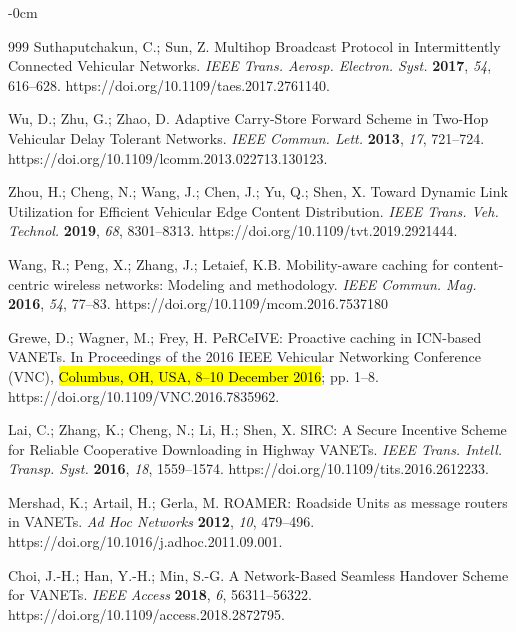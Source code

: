 \documentclass[electronics,aricle,accept,pdftex,moreauthors]{Definitions/mdpi}
\begin{document}
\begin{adjustwidth}{-\extralength}{0cm}
\begin{thebibliography}{999}
Suthaputchakun, C.; Sun, Z. Multihop Broadcast Protocol in Intermittently Connected Vehicular Networks. \emph{IEEE Trans. Aerosp. Electron. Syst.} \textbf{2017}, \emph{54}, 616–628. https://doi.org/10.1109/taes.2017.2761140.

Wu, D.; Zhu, G.; Zhao, D. Adaptive Carry-Store Forward Scheme in Two-Hop Vehicular Delay Tolerant Networks. \emph{IEEE Commun. Lett.} \textbf{2013}, \emph{17}, 721–724. https://doi.org/10.1109/lcomm.2013.022713.130123.

Zhou, H.; Cheng, N.; Wang, J.; Chen, J.; Yu, Q.; Shen, X. Toward Dynamic Link Utilization for Efficient Vehicular Edge Content Distribution. \emph{IEEE Trans. Veh. Technol.} \textbf{2019}, \emph{68}, 8301–8313. https://doi.org/10.1109/tvt.2019.2921444.

Wang, R.; Peng, X.; Zhang, J.; Letaief, K.B. Mobility-aware caching for content-centric wireless networks: Modeling and methodology. \emph{IEEE Commun. Mag. }\textbf{2016}, \emph{54}, 77–83. https://doi.org/10.1109/mcom.2016.7537180

Grewe, D.; Wagner, M.; Frey, H. PeRCeIVE: Proactive caching in ICN-based VANETs. In Proceedings of the 2016 IEEE Vehicular Networking Conference (VNC), \hl{Columbus, OH, USA, 8--10 December 2016}; pp. 1--8. https://doi.org/10.1109/VNC.2016.7835962.

Lai, C.; Zhang, K.; Cheng, N.; Li, H.; Shen, X. SIRC: A Secure Incentive Scheme for Reliable Cooperative Downloading in Highway VANETs. \emph{IEEE Trans. Intell. Transp. Syst.} \textbf{2016}, \emph{18}, 1559--1574. https://doi.org/10.1109/tits.2016.2612233.

Mershad, K.; Artail, H.; Gerla, M. ROAMER: Roadside Units as message routers in VANETs. \emph{Ad Hoc Networks} \textbf{2012}, \emph{10}, 479--496. https://doi.org/10.1016/j.adhoc.2011.09.001.

Choi, J.-H.; Han, Y.-H.; Min, S.-G. A Network-Based Seamless Handover Scheme for VANETs. \emph{IEEE Access} \textbf{2018}, \emph{6}, 56311--56322. https://doi.org/10.1109/access.2018.2872795.


\end{thebibliography}
\end{adjustwidth}
\end{document}
